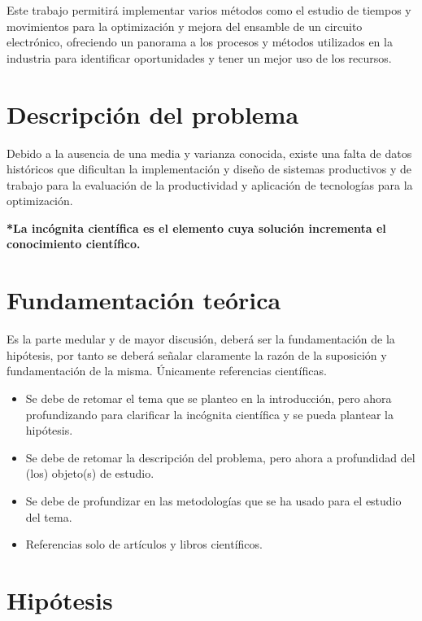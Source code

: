     Este trabajo permitirá implementar varios métodos como el estudio de tiempos y movimientos para la optimización y mejora del ensamble de un circuito electrónico, ofreciendo un panorama a los procesos y métodos utilizados en la industria para identificar oportunidades y tener un mejor uso de los recursos. 
    
    \section{Descripción del problema}
    
    
    Debido a la ausencia de una media y varianza conocida, existe una falta de datos históricos que dificultan la implementación y diseño de sistemas productivos y de trabajo para la evaluación de la productividad y aplicación de tecnologías para la optimización.
    
    
    \textbf{*La incógnita científica es el elemento cuya solución incrementa el conocimiento científico.}
    \section{Fundamentación teórica}
    
    Es la parte medular y de mayor discusión, deberá ser la fundamentación de la hipótesis, por tanto se deberá señalar claramente la razón de la suposición y fundamentación de la misma. Únicamente referencias científicas.
    \begin{itemize}
        \item Se debe de retomar el tema que se planteo en la introducción, pero ahora profundizando para clarificar la incógnita científica y se pueda plantear la hipótesis.
        \item Se debe de retomar la descripción del problema, pero ahora a profundidad del (los) objeto(s) de estudio. 
        \item Se debe de profundizar en las metodologías que se ha usado para el estudio del tema.
        \item Referencias solo de artículos y libros científicos.
    \end{itemize}
    \section{Hipótesis}
